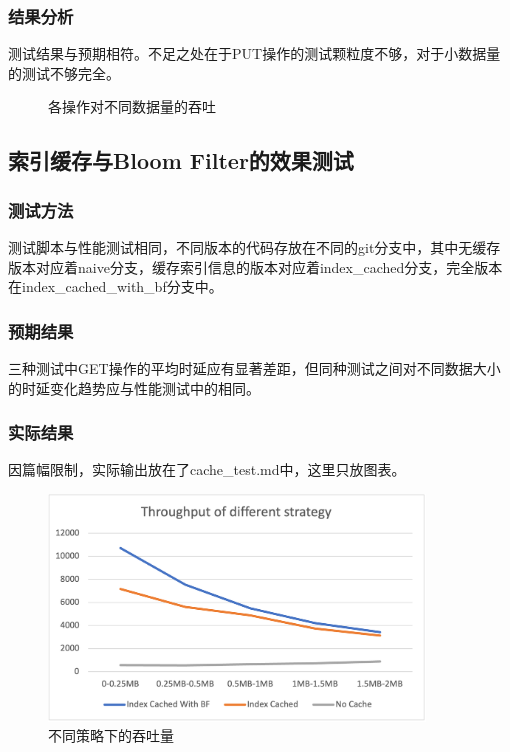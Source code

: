 \documentclass{ctexart}
\begin{document}
\subsubsection{结果分析}
测试结果与预期相符。不足之处在于PUT操作的测试颗粒度不够，对于小数据量的测试不够完全。
\begin{figure}[h!]
  \centering
  \caption{各操作对不同数据量的吞吐}
\end{figure}


\subsection{索引缓存与Bloom Filter的效果测试}

\subsubsection{测试方法}
测试脚本与性能测试相同，不同版本的代码存放在不同的git分支中，其中无缓存版本对应着naive分支，缓存索引信息的版本对应着index\_cached分支，完全版本在index\_cached\_with\_bf分支中。

\subsubsection{预期结果}
三种测试中GET操作的平均时延应有显著差距，但同种测试之间对不同数据大小的时延变化趋势应与性能测试中的相同。

\subsubsection{实际结果}
因篇幅限制，实际输出放在了cache\_test.md中，这里只放图表。
\begin{figure}[h!]
  \centering
  \includegraphics[width=10cm]{Strategy.png}
  \caption{不同策略下的吞吐量}
\end{figure}
\end{document}
